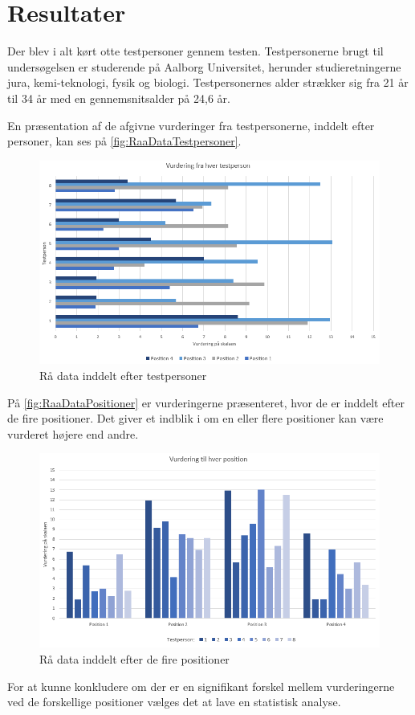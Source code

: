 \section*{Resultater}
\label{Results}
%
Der blev i alt kørt otte testpersoner gennem testen. Testpersonerne brugt til undersøgelsen er studerende på Aalborg Universitet, herunder studieretningerne jura, kemi-teknologi, fysik og biologi. Testpersonernes alder strækker sig fra 21 år til 34 år med en gennemsnitsalder på 24,6 år.

\noindent En præsentation af de afgivne vurderinger fra testpersonerne, inddelt efter personer, kan ses på \autoref{fig:RaaDataTestpersoner}. 

\begin{figure}[H]
\centering
\includegraphics[width = \textwidth]{Figure/RaaDataTestpersoner.PNG} 
\caption{Rå data inddelt efter testpersoner}
\label{fig:RaaDataTestpersoner}
\end{figure}
%
\noindent På \autoref{fig:RaaDataPositioner} er vurderingerne præsenteret, hvor de er inddelt efter de fire positioner. Det giver et indblik i om en eller flere positioner kan være vurderet højere end andre. 
%
\begin{figure}[H]
\centering
\includegraphics[width = \textwidth]{Figure/RaaDataPositioner.PNG} 
\caption{Rå data inddelt efter de fire positioner}
\label{fig:RaaDataPositioner}
\end{figure}
%
\noindent For at kunne konkludere om der er en signifikant forskel mellem vurderingerne ved de forskellige positioner vælges det at lave en statistisk analyse. 